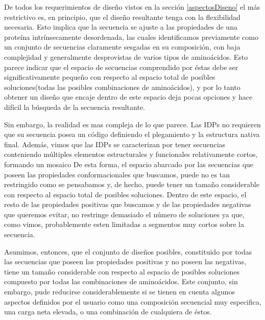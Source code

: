De todos los requerimientos de diseño vistos en la sección \ref{aspectosDiseno} el más restrictivo es, en principio, que el diseño resultante tenga con la flexibilidad necesaria. 
Esto implica que la secuencia se ajuste a las propiedades de una proteína intrínsecamente desordenada, las cuales identificamos previamente como un conjunto de secuencias 
claramente sesgadas en su composición, con baja complejidad y generalmente desprovistas de varios tipos de aminoácidos.
Esto parece indicar que el espacio de secuencias comprendido por éstas debe ser significativamente pequeño con respecto al espacio total de posibles soluciones(todas las posibles combinaciones de aminoácidos),
y por lo tanto obtener un diseño que encaje dentro de este espacio deja pocas opciones y hace difícil la búsqueda de la secuencia resultante.

Sin embargo, la realidad es mas compleja de lo que parece.
Las IDPs no requieren que su secuencia posea un código definiendo el plegamiento y la estructura nativa final. 
Además, vimos que las IDPs se caracterizan por tener secuencias conteniendo múltiples elementos estructurales y funcionales relativamente cortos, formando un mosaico 
De esta forma, el espacio abarcado por las secuencias que poseen las propiedades conformacionales que buscamos, puede no es tan restringido como se pensabamos y, de hecho,
puede tener un tamaño considerable con respecto al espacio total de posibles soluciones.
Dentro de este espacio, el resto de las propiedades positivas que buscamos y de las propiedades negativas que queremos evitar, no restringe demasiado el número de soluciones
ya que, como vimos, probablemente esten limitadas a segmentos muy cortos sobre la secuencia.

Asumimos, entonces, que el conjunto de diseños posibles, constituido por todas las secuencias que poseen las propiedades positivas y 
no poseen las negativas, tiene un tamaño considerable con respecto al espacio de posibles soluciones compuesto por todas las combinaciones de aminoácidos.
Este conjunto, sin embargo, pude reducirse considerablemente si se tienen en cuenta algunos aspectos definidos por el usuario 
como una composición secuencial muy especifica, una carga neta elevada, o una combinación de cualquiera de éstos. 















